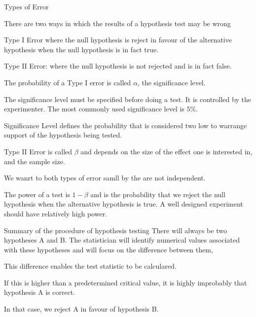 
Types of Error

There are two ways in which the results of a hypothesis test may be wrong

Type I Error where the null hypothesis is reject in favour of the alternative hypothesis when the null hypothesis is in fact true.

Type II Error: where the null hypothesis is not rejected and is in fact false.



The probability of a Type I error is called $\alpha$, the significance level.

The significance level must be specified before doing a test. It is controlled by the experimenter.
The most commonly used significance level is $5\%$.


Significance Level defines the probability that is considered two low to warrange support of the hypothesis being tested.

Type II Error is called $\beta$ and depends on the size of the effect one is interested in, and the sample size.

We wanrt to both types of error samll by the are not independent.

The power of a test is $1- \beta$ and is the probability that we reject the null hypothesis when the alternative hypothesis is true.
A well designed experiment should have relatively high power.

Summary of the procedure of hypothesis testing
There will always be two hypotheses A and B. The statistician will identify numerical values associated
with these hypotheses and will focus on the difference between them,

This difference enables the test statistic to be calculared.

If this is higher than a predetermined critical value, it is highly improbably that hypothesis A is correct.

In that case, we reject A in favour of hypothesis B.




